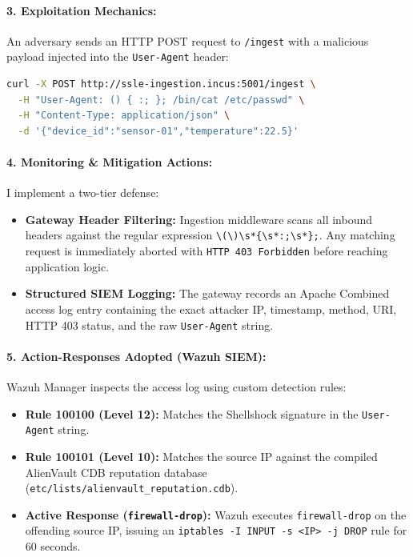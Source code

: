 \paragraph{3. Exploitation Mechanics:}
An adversary sends an HTTP POST request to \texttt{/ingest} with a malicious payload injected into the \texttt{User-Agent} header:
\begin{lstlisting}[language=bash]
curl -X POST http://ssle-ingestion.incus:5001/ingest \
  -H "User-Agent: () { :; }; /bin/cat /etc/passwd" \
  -H "Content-Type: application/json" \
  -d '{"device_id":"sensor-01","temperature":22.5}'
\end{lstlisting}

\paragraph{4. Monitoring \& Mitigation Actions:}
I implement a two-tier defense:
\begin{itemize}
    \item \textbf{Gateway Header Filtering:} Ingestion middleware scans all inbound headers against the regular expression \texttt{\textbackslash(\textbackslash)\textbackslash s*\{\textbackslash s*:;\textbackslash s*\};}. Any matching request is immediately aborted with \texttt{HTTP 403 Forbidden} before reaching application logic.
    \item \textbf{Structured SIEM Logging:} The gateway records an Apache Combined access log entry containing the exact attacker IP, timestamp, method, URI, HTTP 403 status, and the raw \texttt{User-Agent} string.
\end{itemize}

\paragraph{5. Action-Responses Adopted (Wazuh SIEM):}
Wazuh Manager inspects the access log using custom detection rules:
\begin{itemize}
    \item \textbf{Rule 100100 (Level 12):} Matches the Shellshock signature in the \texttt{User-Agent} string.
    \item \textbf{Rule 100101 (Level 10):} Matches the source IP against the compiled AlienVault CDB reputation database (\texttt{etc/lists/alienvault\_reputation.cdb}).
    \item \textbf{Active Response (\texttt{firewall-drop}):} Wazuh executes \texttt{firewall-drop} on the offending source IP, issuing an \texttt{iptables -I INPUT -s <IP> -j DROP} rule for 60 seconds.
\end{itemize}

